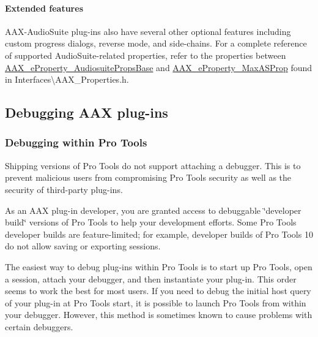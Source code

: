 \hypertarget{a00830_subsubsection_extended_features}{}\paragraph{Extended features}\label{a00830_subsubsection_extended_features}
 A\+A\+X-\/\+Audio\+Suite plug-\/ins also have several other optional features including custom progress dialogs, reverse mode, and side-\/chains. For a complete reference of supported Audio\+Suite-\/related properties, refer to the properties between \mbox{\hyperlink{a00662_a13e384f22825afd3db6d68395b79ce0dae774ad8d49f9d021fc39e7d9c6f08070}{A\+A\+X\+\_\+e\+Property\+\_\+\+Audiosuite\+Props\+Base}} and \mbox{\hyperlink{a00662_a13e384f22825afd3db6d68395b79ce0dac1731b45ed9daa8380c224c9d2b4050a}{A\+A\+X\+\_\+e\+Property\+\_\+\+Max\+A\+S\+Prop}} found in Interfaces\textbackslash{}\+A\+A\+X\+\_\+\+Properties.\+h.



 \hypertarget{a00830_aax_pro_tools_guide_06_debugging_aax_plugins}{}\subsection{Debugging A\+A\+X plug-\/ins}\label{a00830_aax_pro_tools_guide_06_debugging_aax_plugins}
 \hypertarget{a00830_subsection__debugging_within_pro_tools}{}\subsubsection{Debugging within Pro Tools}\label{a00830_subsection__debugging_within_pro_tools}
 Shipping versions of Pro Tools do not support attaching a debugger. This is to prevent malicious users from compromising Pro Tools security as well as the security of third-\/party plug-\/ins.

As an A\+AX plug-\/in developer, you are granted access to debuggable \char`\"{}developer build\char`\"{} versions of Pro Tools to help your development efforts. Some Pro Tools developer builds are feature-\/limited; for example, developer builds of Pro Tools 10 do not allow saving or exporting sessions.

The easiest way to debug plug-\/ins within Pro Tools is to start up Pro Tools, open a session, attach your debugger, and then instantiate your plug-\/in. This order seems to work the best for most users. If you need to debug the initial host query of your plug-\/in at Pro Tools start, it is possible to launch Pro Tools from within your debugger. However, this method is sometimes known to cause problems with certain debuggers.


